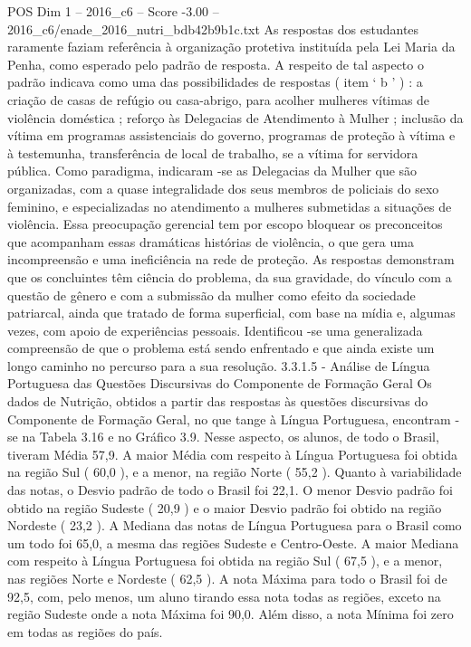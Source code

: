 \begin{textsample}{POS Dim 1 – 2016\_c6 – Score -3.00 – 2016\_c6/enade\_2016\_nutri\_bdb42b9b1c.txt}
As respostas dos estudantes raramente faziam referência à organização protetiva instituída pela Lei Maria da Penha, como esperado pelo padrão de resposta.
A respeito de tal aspecto o padrão indicava como uma das possibilidades de respostas ( item ‘ b ’ ) : a criação de casas de refúgio ou casa-abrigo, para acolher mulheres vítimas de violência doméstica ; reforço às Delegacias de Atendimento à Mulher ; inclusão da vítima em programas assistenciais do governo, programas de proteção à vítima e à testemunha, transferência de local de trabalho, se a vítima for servidora pública.
Como paradigma, indicaram -se as Delegacias da Mulher que são organizadas, com a quase integralidade dos seus membros de policiais do sexo feminino, e especializadas no atendimento a mulheres submetidas a situações de violência.
Essa preocupação gerencial tem por escopo bloquear os preconceitos que acompanham essas dramáticas histórias de violência, o que gera uma incompreensão e uma ineficiência na rede de proteção.
As respostas demonstram que os concluintes têm ciência do problema, da sua gravidade, do vínculo com a questão de gênero e com a submissão da mulher como efeito da sociedade patriarcal, ainda que tratado de forma superficial, com base na mídia e, algumas vezes, com apoio de experiências pessoais.
Identificou -se uma generalizada compreensão de que o problema está sendo enfrentado e que ainda existe um longo caminho no percurso para a sua resolução. 3.3.1.5 - Análise de Língua Portuguesa das Questões Discursivas do Componente de Formação Geral Os dados de Nutrição, obtidos a partir das respostas às questões discursivas do Componente de Formação Geral, no que tange à Língua Portuguesa, encontram -se na Tabela 3.16 e no Gráfico 3.9.
Nesse aspecto, os alunos, de todo o Brasil, tiveram Média 57,9.
A maior Média com respeito à Língua Portuguesa foi obtida na região Sul ( 60,0 ), e a menor, na região Norte ( 55,2 ).
Quanto à variabilidade das notas, o Desvio padrão de todo o Brasil foi 22,1.
O menor Desvio padrão foi obtido na região Sudeste ( 20,9 ) e o maior Desvio padrão foi obtido na região Nordeste ( 23,2 ).
A Mediana das notas de Língua Portuguesa para o Brasil como um todo foi 65,0, a mesma das regiões Sudeste e Centro-Oeste.
A maior Mediana com respeito à Língua Portuguesa foi obtida na região Sul ( 67,5 ), e a menor, nas regiões Norte e Nordeste ( 62,5 ).
A nota Máxima para todo o Brasil foi de 92,5, com, pelo menos, um aluno tirando essa nota todas as regiões, exceto na região Sudeste onde a nota Máxima foi 90,0.
Além disso, a nota Mínima foi zero em todas as regiões do país.

\end{textsample}
